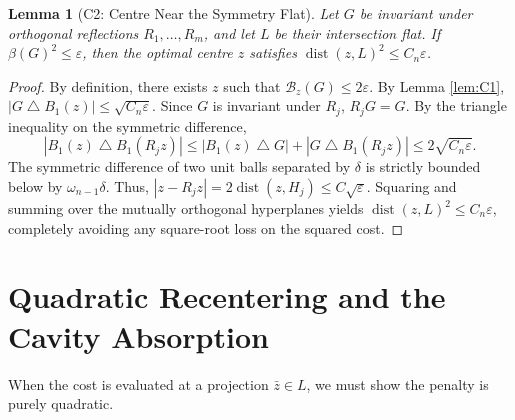 \documentclass[11pt]{article}
\newtheorem{lemma}[theorem]{Lemma}
\newcommand{\B}{\mathcal{B}}
\newcommand{\eps}{\varepsilon}
\begin{document}
\begin{lemma}[C2: Centre Near the Symmetry Flat] \label{lem:C2}
Let $G$ be invariant under orthogonal reflections $R_1, \dots, R_m$, and let $L$ be their intersection flat. If $\beta(G)^2 \le \eps$, then the optimal centre $z$ satisfies $\operatorname{dist}(z, L)^2 \le C_n \eps$.
\end{lemma}
\begin{proof}
By definition, there exists $z$ such that $\B_z(G) \le 2\eps$. By Lemma \ref{lem:C1}, $|G \mathbin{\triangle} B_1(z)| \le \sqrt{C_n \eps}$. Since $G$ is invariant under $R_j$, $R_j G = G$. By the triangle inequality on the symmetric difference, 
\[
|B_1(z) \mathbin{\triangle} B_1(R_j z)| \le |B_1(z) \mathbin{\triangle} G| + |G \mathbin{\triangle} B_1(R_j z)| \le 2\sqrt{C_n \eps}.
\]
The symmetric difference of two unit balls separated by $\delta$ is strictly bounded below by $\omega_{n-1}\delta$. Thus, $|z - R_j z| = 2\operatorname{dist}(z, H_j) \le C \sqrt{\eps}$. Squaring and summing over the mutually orthogonal hyperplanes yields $\operatorname{dist}(z, L)^2 \le C_n \eps$, completely avoiding any square-root loss on the squared cost.
\end{proof}

\section{Quadratic Recentering and the Cavity Absorption}

When the cost is evaluated at a projection $\bar z \in L$, we must show the penalty is purely quadratic.
\end{document}
